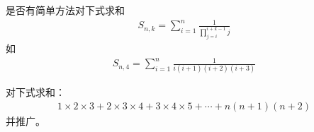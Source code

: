 \begin{example}[推广]
  是否有简单方法对下式求和
  \begin{align*}
    S_{n,k}=\sum_{i=1}^{n} \frac1{\prod_{j=i}^{i+k-1} j}
  \end{align*}
  如
  \begin{align*}
    S_{n,4} = \sum_{i=1}^{n}\frac1{i(i+1)(i+2)(i+3)}
  \end{align*}
\end{example}

\begin{example}
  对下式求和：
  \begin{align*}
    1\times2\times3 + 2\times3\times4 + 3\times4\times5 + \cdots + n(n+1)(n+2)
  \end{align*}
  并推广。
\end{example}

